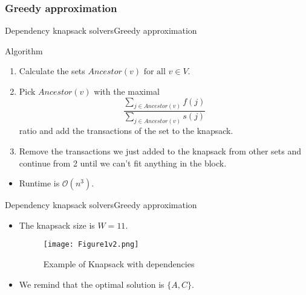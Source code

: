 \documentclass{beamer}
\begin{document}
\subsubsection* {Greedy approximation}

\begin{frame}{Dependency knapsack solvers}{Greedy approximation} %
    \begin{block} {Algorithm}
        \begin{enumerate}
            \item {Calculate the sets $Ancestor(v) \text{ for all } v\in 
            V$.}
            \item {Pick $Ancestor(v)$ with the maximal
             $$\frac{\sum_{j\in Ancestor(v)} f(j)}{\sum_{j\in Ancestor(v)}
              s(j)} $$ ratio and add the transactions of the set to the
               knapsack. }
            \item {Remove the transactions we just added to the knapsack 
            from other sets and continue from 2 until we can't fit 
            anything in the block.}
        \end{enumerate}
    \end{block}
    \begin{itemize}
        \item {Runtime is $\mathcal{O} (n^3)$.}
    \end{itemize}
\end{frame}

\begin{frame}{Dependency knapsack solvers}{Greedy approximation} %
    \begin{example}
    \begin{itemize}
        \item {The knapsack size is $W=11$.}
        \begin{figure}
            \centering
            \texttt{[image: Figure1v2.png]}
            \caption{Example of Knapsack with dependencies}
        \end{figure}
        \item {We remind that the optimal solution is $\{A,C\}$.}
    \end{itemize}
    \end{example}
\end{frame}
\end{document}

